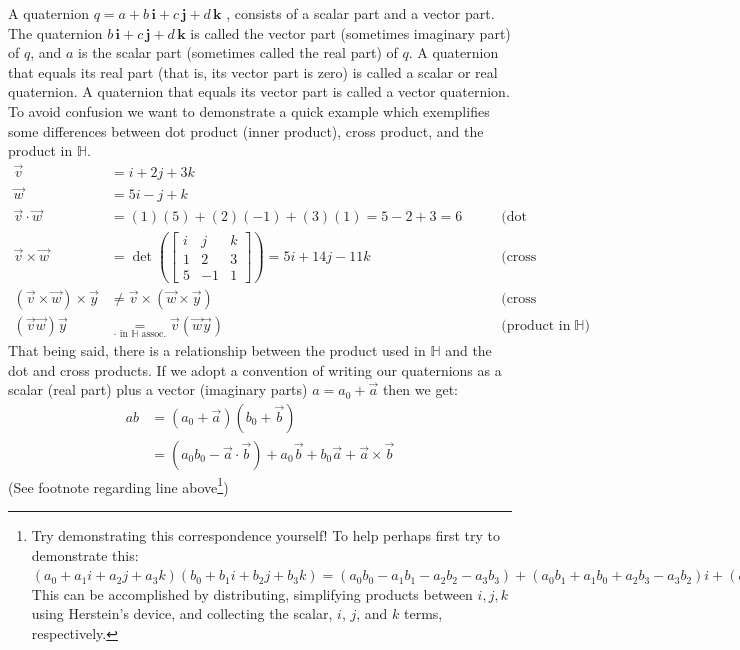 \noindent A quaternion $q=a+b\,\mathbf {i} +c\,\mathbf {j} +d\,\mathbf {k}$ , consists of a scalar part and a vector part. The quaternion $ b\,\mathbf {i} +c\,\mathbf {j} +d\,\mathbf {k} $ is called the vector part (sometimes imaginary part) of $q$, and $a$ is the scalar part (sometimes called the real part) of $q$. A quaternion that equals its real part (that is, its vector part is zero) is called a scalar or real quaternion. A quaternion that equals its vector part is called a vector quaternion. To avoid confusion we want to demonstrate a quick example which exemplifies some differences between dot product (inner product), cross product, and the product in $\mathbb{H}$.
\begin{align}
    \overrightarrow{v}&= i+2j+3k &\nonumber \\
    \overrightarrow{w}&= 5i-j+k &\nonumber \\
    \overrightarrow{v}\cdot \overrightarrow{w} &= (1)(5)+(2)(-1)+(3)(1)=5-2+3=6 \ \ \ \ \ \ \ \ \ &\text{(dot product)}\nonumber \\
    \overrightarrow{v}\times \overrightarrow{w} &= \det\left(\begin{bmatrix}
            i&j&k \\ 1&2&3 \\ 5&-1&1
    \end{bmatrix}\right) = 5i+14j-11k \ \ \ \ \ \ \ \ \ &\text{(cross product)}\nonumber \\
    (\overrightarrow{v}\times \overrightarrow{w})\times \overrightarrow{y} &\neq \overrightarrow{v}\times (\overrightarrow{w}\times \overrightarrow{y}) &\text{(cross products are non-associative)}\nonumber \\
    (\overrightarrow{v}\overrightarrow{w})\overrightarrow{y}&\underset{\cdot \text{ in } \mathbb{H} \text{ assoc.}}{=}\overrightarrow{v}(\overrightarrow{w}\overrightarrow{y}) \ \ \ \ \ \ \ \ \ &\text{(product in }\mathbb{H})\nonumber
\end{align}
\newpage
That being said, there is a relationship between the product used in $\mathbb{H}$ and the dot and cross products. If we adopt a convention of writing our quaternions as a scalar (real part) plus a vector (imaginary parts) $a=a_0+\overrightarrow{a}$ then we get:
\begin{align}
    ab &=(a_0+\overrightarrow{a})(b_0+\overrightarrow{b}) \nonumber \\
    &= (a_0b_0 - \overrightarrow{a}\cdot \overrightarrow{b}) + a_0 \overrightarrow{b}+b_0\overrightarrow{a}+\overrightarrow{a}\times \overrightarrow{b} \nonumber 
    \end{align} (See footnote regarding line above\footnote{Try demonstrating this correspondence yourself! To help perhaps first try to demonstrate this: \\ $(a_0+a_1i+a_2j+a_3k)(b_0+b_1i+b_2j+b_3k)= (a_0b_0-a_1b_1-a_2b_2-a_3b_3)+(a_0b_1+a_1b_0+a_2b_3-a_3b_2)i+(a_0b_2+a_2b_0+a_3b_1-a_1b_3)j+(a_0b_3+a_3b_0+a_1b_2-a_2b_1)k$ This can be accomplished by distributing, simplifying products between $i,j,k$ using Herstein's device, and collecting the scalar, $i$, $j$, and $k$ terms, respectively.})
